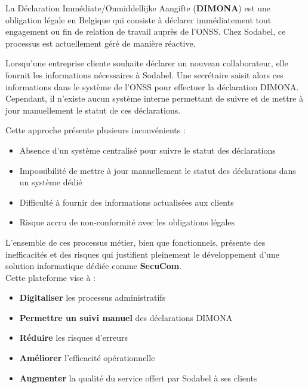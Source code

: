 La Déclaration Immédiate/Onmiddellijke Aangifte (\textbf{DIMONA}) est une obligation légale en Belgique qui consiste à déclarer immédiatement tout engagement ou fin de relation de travail auprès de l'ONSS. Chez Sodabel, ce processus est actuellement géré de manière réactive.

\noindent Lorsqu'une entreprise cliente souhaite déclarer un nouveau collaborateur, elle fournit les informations nécessaires à Sodabel. Une secrétaire saisit alors ces informations dans le système de l'ONSS pour effectuer la déclaration DIMONA. Cependant, il n'existe aucun système interne permettant de suivre et de mettre à jour manuellement le statut de ces déclarations.

\noindent Cette approche présente plusieurs inconvénients :
\begin{itemize}[leftmargin=*,label=\textcolor{darkgray}{$\bullet$},itemsep=0.3em]
  \item Absence d'un système centralisé pour suivre le statut des déclarations
  \item Impossibilité de mettre à jour manuellement le statut des déclarations dans un système dédié
  \item Difficulté à fournir des informations actualisées aux clients
  \item Risque accru de non-conformité avec les obligations légales
\end{itemize}

\vspace{1cm}

\begin{tcolorbox}[
  title={\textbf{Solution proposée : SecuCom}},
  colback=blue!5!white,
  colframe=primarycolor,
  fonttitle=\bfseries,
  boxrule=0.5mm,
  arc=2mm,
  left=6mm,
  right=6mm,
  top=6mm,
  bottom=6mm
]
\noindent L'ensemble de ces processus métier, bien que fonctionnels, présente des inefficacités et des risques qui justifient pleinement le développement d'une solution informatique dédiée comme \textbf{SecuCom}.\\

\noindent Cette plateforme vise à :
\begin{itemize}[leftmargin=*,label=\textcolor{darkgray}{$\bullet$},itemsep=0.3em]
  \item \textbf{Digitaliser} les processus administratifs
  \item \textbf{Permettre un suivi manuel} des déclarations DIMONA
  \item \textbf{Réduire} les risques d'erreurs
  \item \textbf{Améliorer} l'efficacité opérationnelle
  \item \textbf{Augmenter} la qualité du service offert par Sodabel à ses clients
\end{itemize}
\end{tcolorbox}
